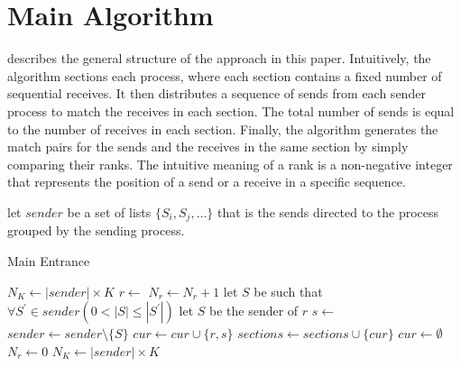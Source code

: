 \section{Main Algorithm}


 describes the general structure of the approach in this paper.
Intuitively, the algorithm sections each process, where each section contains a fixed number of sequential receives. It then distributes a sequence of sends from each sender process to match the receives in each section. The total number of sends is equal to the number of receives in each section. Finally, the algorithm generates the match pairs for the sends and the receives in the same section by simply comparing their ranks. The intuitive meaning of a rank is a non-negative integer that represents the position of a send or a receive in a specific sequence.

\begin{comment}
Sections = {}
cur = {}

while | R | \neq 0 {
  r = dequeue(R);
  S = ()
  if from(r) = * 
     Let S be such that \forall S' \in {S_i, S_j, ...} (count(S) \lte count(S’)) and | S | \neq 0)
	  count(S) += 1
  else
     Let S be such that S = Sender(r)

  cur = cur \cup {r, dequeue(S)}
  if \forall S \in {S_i, S_j, ...} (count(S) = k \vee |S| = 0 \vee | R | = 0)
     Sections  = Sections \cup {cur}
	  cur = {}
	  \forall S \in {S_i, S_j, ...} count(S) = 0;
}
\end{comment}


let $\mathit{sender}$ be a set of lists $\{S_i, S_j, …\}$ that is the sends directed to the process grouped by the sending process.

\begin{algorithm}
\caption{Main Entrance}\label{algo:main}
\begin{algorithmic}[1]
\State $N_K\gets|\mathit{sender}|\times K$
\State $r \gets$ 
\State $N_r\gets N_r+1$
\State let $S$ be such that $\forall S^\prime \in \mathit{sender}(0<|S|\le |S^\prime| )$
\Else 
\State let $S$ be the sender of $r$
\EndIf
\State $s\gets$ 
\State $\mathit{sender}\gets\mathit{sender} \setminus \{S\}$
\EndIf
\State $\mathit{cur}\gets \mathit{cur}\cup \{r,s\}$
\State $\mathit{sections}\gets\mathit{sections}\cup\{\mathit{cur}\}$
\State $\mathit{cur}\gets\emptyset$
\State $N_r\gets 0$
\State $N_K\gets|\mathit{sender}|\times K$
\EndIf
\EndWhile
\end{algorithmic}
\end{algorithm}



